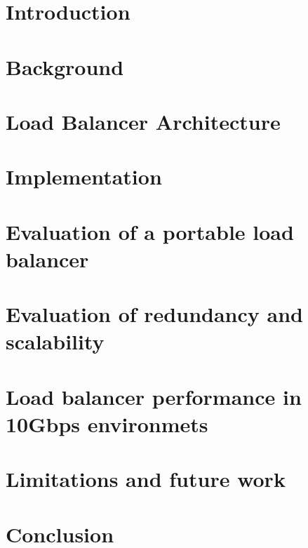 
\graphicspath{{Manuscript/}}

\chapter{Introduction}\label{chapter:introduction}


\chapter{Background}\label{chapter:background}



\chapter{Load Balancer Architecture}\label{chapter:architecture}


\chapter{Implementation}\label{chapter:implemetation}


\chapter{Evaluation of a portable load balancer}\label{chapter:portablelb}


\chapter{Evaluation of redundancy and scalability}\label{chapter:redundancy}


\chapter{Load balancer performance in 10Gbps environmets}\label{chapter:performance}


\chapter{Limitations and future work}\label{chapter:futurework}


\chapter{Conclusion}\label{chapter:conclusion}

%


